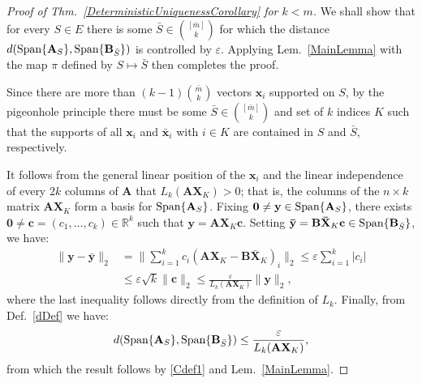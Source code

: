 \documentclass[9pt,twocolumn]{pnas-new}
\begin{document}
\begin{proof}[Proof of Thm.~\ref{DeterministicUniquenessCorollary} for $k < m$] 
We shall show that for every $S \in E$ there is some $\bar S \in {[\bar m] \choose k}$ for which the distance $d(\text{\rm Span}\{\mathbf{A}_S\}, \text{\rm Span}\{\mathbf{B}_{\bar S}\})$ is controlled by $\varepsilon$. Applying Lem.~\ref{MainLemma} with the map $\pi$ defined by $S \mapsto \bar S$ then completes the proof.  

Since there are more than $(k-1){\bar m \choose k}$ vectors $\mathbf{x}_i$ supported on $S$, by the pigeonhole principle there must be some $\bar S \in {[\bar m] \choose k}$ and set of $k$ indices $K$ such that the supports of all $\mathbf{x}_i$ and $\mathbf{\bar x}_i$ with $i \in K$ are contained in $S$ and $\bar S$, respectively.

It follows from the general linear position of the $\mathbf{x}_i$ and the linear independence of every $2k$ columns of $\mathbf{A}$ that $L_k(\mathbf{AX}_{K}) > 0$; that is, the columns of the $n \times k$ matrix $\mathbf{AX}_K$ form a basis for $\text{\rm Span}\{\mathbf{A}_{S}\}$. Fixing $\mathbf{0} \neq \mathbf{y} \in \text{\rm Span}\{\mathbf{A}_{S}\}$, there exists $\mathbf{0} \neq \mathbf{c} = (c_1, \ldots, c_k) \in \mathbb{R}^k$ such that $\mathbf{y} = \mathbf{AX}_K\mathbf{c}$. Setting \mbox{$\mathbf{\bar{y}} = \mathbf{B\bar{X}}_K\mathbf{c} \in \text{\rm Span}\{\mathbf{B}_{\bar S}\}$}, we have:
\begin{align*}
\|\mathbf{y} - \mathbf{\bar{y}}\|_2 
&= \|\sum_{i=1}^k c_i(\mathbf{AX}_K - \mathbf{B\bar{X}}_K)_i\|_2
\leq \varepsilon \sum_{i=1}^k |c_i| \\
&\leq \varepsilon \sqrt{k}  \|\mathbf{c}\|_2 
\leq \frac{\varepsilon}{L_k(\mathbf{AX}_K)} \|\mathbf{y}\|_2,
\end{align*}
where the last inequality follows directly from the definition of $L_k$. Finally, from Def.~\ref{dDef} we have:
\begin{align}\label{rhs222}
d(\text{\rm Span}\{\mathbf{A}_S\}, \text{\rm Span}\{\mathbf{B}_{\bar S}\}) 
\leq \frac{\varepsilon}{  L_k(\mathbf{AX}_{K}) },
\end{align}
%
from which the result follows by \eqref{Cdef1} and Lem.~\ref{MainLemma}.
\end{proof}
\end{document}
